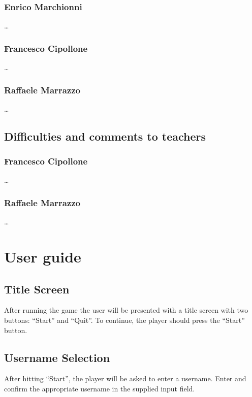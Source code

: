 \documentclass[12pt, a4paper]{report}
\theoremstyle{definition}
\begin{document}
    \subsection*{Enrico Marchionni}
    
    \dots

    \subsection*{Francesco Cipollone}

    \dots

    \subsection*{Raffaele Marrazzo}

    \dots

\section{Difficulties and comments to teachers}

    \subsection*{Francesco Cipollone}

    \dots

    \subsection*{Raffaele Marrazzo}

    \dots

\appendix

\chapter{User guide}

\section{Title Screen}
After running the game the user will be presented with a title screen with two buttons: ``Start'' and ``Quit''. To continue, the player should press the ``Start'' button.

\section{Username Selection}
After hitting ``Start'', the player will be asked to enter a username. Enter and confirm the appropriate username in the supplied input field.
\end{document}
